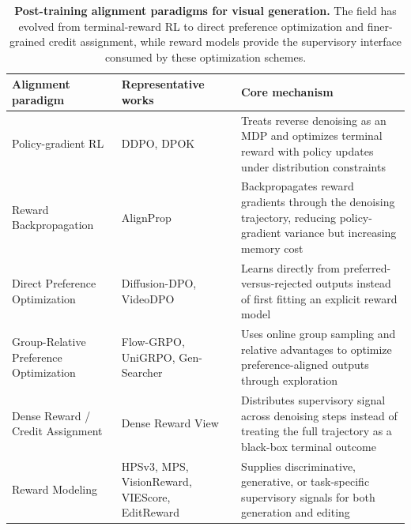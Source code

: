 \documentclass{llmxive}
\providecommand{\arraystretch}{1.20}
\begin{document}
\begin{table}[t]
\centering
\footnotesize
\setlength{\tabcolsep}{4pt}
\renewcommand{\arraystretch}{1.16}
\begin{tabularx}{\textwidth}{@{}>{\arraybackslash}p{3.2cm}>{\arraybackslash}p{3.4cm}>{\arraybackslash}X@{}}
\toprule
\textbf{Alignment paradigm} & \textbf{Representative works} & \textbf{Core mechanism} \\
\midrule
Policy-gradient RL & DDPO, DPOK & Treats reverse denoising as an MDP and optimizes terminal reward with policy updates under distribution constraints \\
Reward Backpropagation & AlignProp & Backpropagates reward gradients through the denoising trajectory, reducing policy-gradient variance but increasing memory cost \\
Direct Preference Optimization & Diffusion-DPO, VideoDPO & Learns directly from preferred-versus-rejected outputs instead of first fitting an explicit reward model \\
Group-Relative Preference Optimization & Flow-GRPO, UniGRPO, Gen-Searcher & Uses online group sampling and relative advantages to optimize preference-aligned outputs through exploration \\
Dense Reward / Credit Assignment & Dense Reward View & Distributes supervisory signal across denoising steps instead of treating the full trajectory as a black-box terminal outcome \\
Reward Modeling & HPSv3, MPS, VisionReward, VIEScore, EditReward & Supplies discriminative, generative, or task-specific supervisory signals for both generation and editing \\
\bottomrule
\end{tabularx}
\caption{\textbf{Post-training alignment paradigms for visual generation.} The field has evolved from terminal-reward RL to direct preference optimization and finer-grained credit assignment, while reward models provide the supervisory interface consumed by these optimization schemes.}
\label{tab:posttrain_summary}
\end{table}
\end{document}

